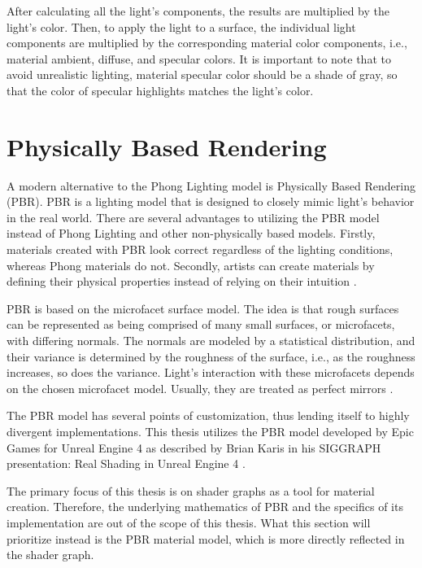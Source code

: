 \documentclass[
  digital,     %
  oneside,     %
  nosansbold,  %
  nocolorbold, %
  lof,         %
  lot,         %
]{fithesis4}
\begin{document}
After calculating all the light's components, the results are multiplied by the light's color.
Then, to apply the light to a surface, the individual light components are multiplied
by the corresponding material color components, i.e., material ambient, diffuse, and specular colors.
It is important to note that to avoid unrealistic lighting, material specular color should be a shade of gray,
so that the color of specular highlights matches the light's color.

\section{Physically Based Rendering}
A modern alternative to the Phong Lighting model is Physically Based Rendering (PBR).
PBR is a lighting model that is designed to closely mimic light's behavior in the real world.
There are several advantages to utilizing the PBR model instead of Phong Lighting and other
non-physically based models. Firstly, materials created with PBR look correct regardless
of the lighting conditions, whereas Phong materials do not. Secondly, artists can create
materials by defining their physical properties instead of relying on their intuition \cite{learnopengl-pbr}\cite{ue-pbr}.

PBR is based on the microfacet surface model. The idea is that rough surfaces can be represented
as being comprised of many small surfaces, or microfacets, with differing normals. The normals
are modeled by a statistical distribution, and their variance is determined by the roughness of the surface,
i.e., as the roughness increases, so does the variance.
Light's interaction with these microfacets depends on the chosen microfacet model. Usually, they
are treated as perfect mirrors \cite{pbr-book-microfacet}.

The PBR model has several points of customization, thus lending itself to highly divergent implementations.
This thesis utilizes the PBR model developed by Epic Games
for Unreal Engine 4 as described by Brian Karis in his SIGGRAPH presentation: Real Shading in
Unreal Engine 4 \cite{ue-real-shading}.

The primary focus of this thesis is on shader graphs as a tool for material creation.
Therefore, the underlying mathematics of PBR and the specifics of its implementation are out of the scope
of this thesis. What this section will prioritize instead is the PBR material model, which is more
directly reflected in the shader graph.
\end{document}
